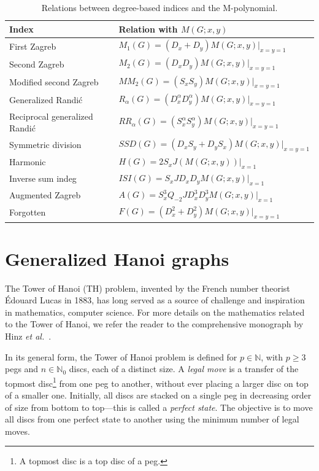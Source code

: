 \documentclass[letterpaper,12pt]{article}
\begin{document}
\begin{table}[htbp]
\centering

\begin{tabular}{ll}
\toprule
Index & Relation with \(M(G;x,y)\) \\
\midrule
First Zagreb & \(M_1(G) = (D_x + D_y) M(G;x,y)\big|_{x=y=1}\) \\
Second Zagreb & \(M_2(G) = (D_x D_y) M(G;x,y)\big|_{x=y=1}\) \\
Modified second Zagreb & \(MM_2(G) = (S_x S_y) M(G;x,y)\big|_{x=y=1}\) \\
Generalized Randić & \(R_{\alpha}(G) = (D_x^\alpha D_y^\alpha) M(G;x,y)\big|_{x=y=1}\) \\
Reciprocal generalized Randić & \(RR_{\alpha}(G) = (S_x^\alpha S_y^\alpha) M(G;x,y)\big|_{x=y=1}\) \\
Symmetric division & \(SSD(G) = (D_x S_y + D_y S_x) M(G;x,y)\big|_{x=y=1}\) \\
Harmonic & \(H(G) = 2 S_x J(M(G;x,y))\big|_{x=1}\) \\
Inverse sum indeg & \(ISI(G) = S_x J D_x D_y M(G;x,y)\big|_{x=1}\) \\
Augmented Zagreb & \(A(G) = S_x^3 Q_{-2} J D_x^3 D_y^3 M(G;x,y)\big|_{x=1}\) \\
Forgotten & \(F(G) = (D_x^2 + D_y^2) M(G;x,y)\big|_{x=y=1}\) \\
\bottomrule
\end{tabular}
\caption{Relations between degree-based indices and the M-polynomial.}
\label{tab:indices}
\end{table}

 


\section{Generalized Hanoi graphs}\label{sec:hanoi}



The Tower of Hanoi (TH) problem, invented by the French number theorist Édouard Lucas in 1883, has long served as a source of challenge and inspiration in mathematics, computer science. For more details on the mathematics related to the Tower of Hanoi, we refer the reader to the comprehensive monograph by Hinz \emph{et al.}~\cite{hinz2018tower}.


In its general form, the Tower of Hanoi problem is defined for $p \in \mathbb{N}$, with $p \geq 3$ pegs and $n \in \mathbb{N}_0$ discs, each of a distinct size. A  \textit{legal move} is a transfer of the topmost disc\footnote{A topmost disc is a top disc of a peg.}  from one peg to another, without ever placing a larger disc on top of a smaller one. Initially, all discs are stacked on a single peg in decreasing order of size from bottom to top—this is called a \textit{perfect state}. The objective is to move all discs from one perfect state to another using the minimum number of legal moves.
\end{document}
